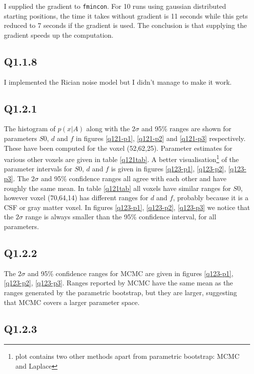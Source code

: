\documentclass[11pt,a4paper,oneside]{report}
\begin{document}
I supplied the gradient to \texttt{fmincon}. For 10 runs using gaussian distributed starting positions, the time it takes without gradient is 11 seconds while this gets reduced to 7 seconds if the gradient is used. The conclusion is that supplying the gradient speeds up the computation.


\subsection*{Q1.1.8}

I implemented the Rician noise model but I didn't manage to make it work.

\subsection*{Q1.2.1}

The histogram of $p(x|A)$ along with the $2\sigma$ and 95\% ranges are shown for parameters $S0$, $d$ and $f$ in figures \ref{q121-p1}, \ref{q121-p2} and \ref{q121-p3} respectively. These have been computed for the voxel (52,62,25). Parameter estimates for various other voxels are given in table \ref{q121tab}. A better visualisation\footnote{plot contains two other methods apart from parametric bootstrap: MCMC and Laplace} of the parameter intervals for $S0$, $d$ and $f$  is given in figures \ref{q123-p1}, \ref{q123-p2}, \ref{q123-p3}. The $2\sigma$ and 95\% confidence ranges all agree with each other and have roughly the same mean. In table \ref{q121tab} all voxels have similar ranges for $S0$, however voxel (70,64,14) has different ranges for 
$d$ and $f$, probably because it is a CSF or gray matter voxel. In figures \ref{q123-p1}, \ref{q123-p2}, \ref{q123-p3} we notice that the $2\sigma$ range is always smaller than the 95\% confidence interval, for all parameters. 

\subsection*{Q1.2.2}

 The $2\sigma$ and 95\% confidence ranges for MCMC are given in figures \ref{q123-p1}, \ref{q123-p2}, \ref{q123-p3}. Ranges reported by MCMC have the same mean as the ranges generated by the parametric bootstrap, but they are larger, suggesting that MCMC covers a larger parameter space.

\subsection*{Q1.2.3}
\end{document}
